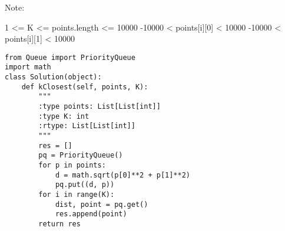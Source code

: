  

Note:

    1 <= K <= points.length <= 10000
    -10000 < points[i][0] < 10000
    -10000 < points[i][1] < 10000
    
\begin{lstlisting}
from Queue import PriorityQueue
import math
class Solution(object):
    def kClosest(self, points, K):
        """
        :type points: List[List[int]]
        :type K: int
        :rtype: List[List[int]]
        """
        res = []
        pq = PriorityQueue()
        for p in points:
            d = math.sqrt(p[0]**2 + p[1]**2)
            pq.put((d, p))
        for i in range(K):
            dist, point = pq.get()
            res.append(point)
        return res
\end{lstlisting}
                


